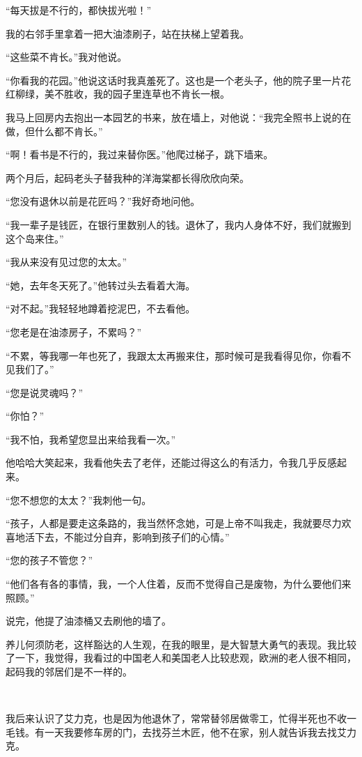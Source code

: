 \par “每天拔是不行的，都快拔光啦！”
\par 我的右邻手里拿着一把大油漆刷子，站在扶梯上望着我。
\par “这些菜不肯长。”我对他说。
\par “你看我的花园。”他说这话时我真羞死了。这也是一个老头子，他的院子里一片花红柳绿，美不胜收，我的园子里连草也不肯长一根。
\par 我马上回房内去抱出一本园艺的书来，放在墙上，对他说：“我完全照书上说的在做，但什么都不肯长。”
\par “啊！看书是不行的，我过来替你医。”他爬过梯子，跳下墙来。
\par 两个月后，起码老头子替我种的洋海棠都长得欣欣向荣。
\par “您没有退休以前是花匠吗？”我好奇地问他。
\par “我一辈子是钱匠，在银行里数别人的钱。退休了，我内人身体不好，我们就搬到这个岛来住。”
\par “我从来没有见过您的太太。”
\par “她，去年冬天死了。”他转过头去看着大海。
\par “对不起。”我轻轻地蹲着挖泥巴，不去看他。
\par “您老是在油漆房子，不累吗？”
\par “不累，等我哪一年也死了，我跟太太再搬来住，那时候可是我看得见你，你看不见我们了。”
\par “您是说灵魂吗？”
\par “你怕？”
\par “我不怕，我希望您显出来给我看一次。”
\par 他哈哈大笑起来，我看他失去了老伴，还能过得这么的有活力，令我几乎反感起来。
\par “您不想您的太太？”我刺他一句。
\par “孩子，人都是要走这条路的，我当然怀念她，可是上帝不叫我走，我就要尽力欢喜地活下去，不能过分自弃，影响到孩子们的心情。”
\par “您的孩子不管您？”
\par “他们各有各的事情，我，一个人住着，反而不觉得自己是废物，为什么要他们来照顾。”
\par 说完，他提了油漆桶又去刷他的墙了。
\par 养儿何须防老，这样豁达的人生观，在我的眼里，是大智慧大勇气的表现。我比较了一下，我觉得，我看过的中国老人和美国老人比较悲观，欧洲的老人很不相同，起码我的邻居们是不一样的。
\par  
\par 我后来认识了艾力克，也是因为他退休了，常常替邻居做零工，忙得半死也不收一毛钱。有一天我要修车房的门，去找芬兰木匠，他不在家，别人就告诉我去找艾力克。
